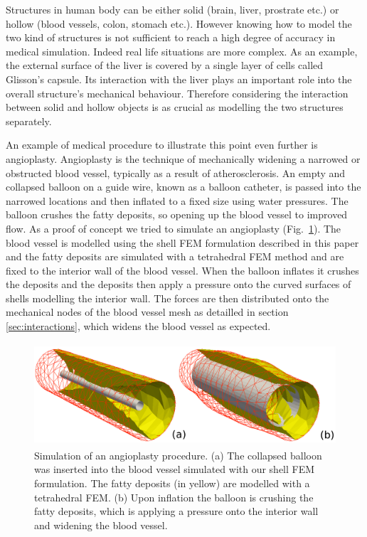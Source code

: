 \documentclass{llncs}
\begin{document}
Structures in human body can be either solid (brain, liver, prostrate etc.) or hollow (blood vessels, colon, stomach etc.). However knowing how to model the two kind of structures is not sufficient to reach a high degree of accuracy in medical simulation. Indeed real life situations are more complex. As an example, the external surface of the liver is covered by a single layer of cells called Glisson's capsule. Its interaction with the liver plays an important role into the overall structure's mechanical behaviour. Therefore considering the interaction between solid and hollow objects is as crucial as modelling the two structures separately. 

An example of medical procedure to illustrate this point even further is angioplasty. Angioplasty is the technique of mechanically widening a narrowed or obstructed blood vessel, typically as a result of atherosclerosis. An empty and collapsed balloon on a guide wire, known as a balloon catheter, is passed into the narrowed locations and then inflated to a fixed size using water pressures. The balloon crushes the fatty deposits, so opening up the blood vessel to improved flow. As a proof of concept we tried to simulate an angioplasty (Fig.~\ref{fig-stent}). The blood vessel is modelled using the shell FEM formulation described in this paper and the fatty deposits are simulated with a tetrahedral FEM method and are fixed to the interior wall of the blood vessel. When the balloon inflates it crushes the deposits and the deposits then apply a pressure onto the curved surfaces of shells modelling the interior wall. The forces are then distributed onto the mechanical nodes of the blood vessel mesh as detailled in section \ref{sec:interactions}, which widens the blood vessel as expected. 

\begin{figure}
\centering
\includegraphics[height=3.8cm]{images/angioplasty.png}
\caption {Simulation of an angioplasty procedure. (a) The collapsed balloon was inserted into the blood vessel simulated with our shell FEM formulation. The fatty deposits (in yellow) are modelled with a tetrahedral FEM. (b) Upon inflation the balloon is crushing the fatty deposits, which is applying a pressure onto the interior wall and widening the blood vessel.}
\label{fig-stent}
\end{figure}
\end{document}
